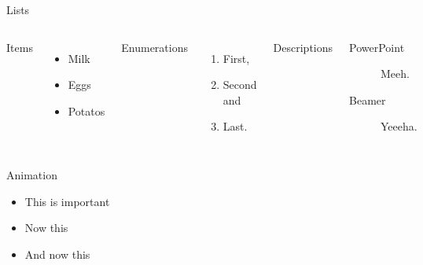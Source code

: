 \documentclass[10pt]{beamer}
\begin{document}
\begin{frame}{Lists}
  \begin{columns}[T,onlytextwidth]
      Items
      \begin{itemize}
        \item Milk \item Eggs \item Potatos
      \end{itemize}

      Enumerations
      \begin{enumerate}
        \item First, \item Second and \item Last.
      \end{enumerate}

      Descriptions
      \begin{description}
        \item[PowerPoint] Meeh. \item[Beamer] Yeeeha.
      \end{description}
  \end{columns}
\end{frame}
\begin{frame}{Animation}
  \begin{itemize}[<+- | alert@+>]
    \item \alert<4>{This is important}
    \item Now this
    \item And now this
  \end{itemize}
\end{frame}
\end{document}
